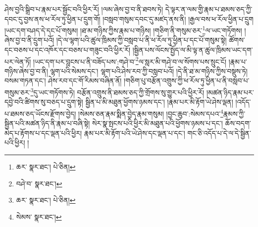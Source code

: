 ཤེས་བྱའི་སྒྲིབ་པ་རྣམ་པར་སྦྱོང་བའི་ཕྱིར་རོ། །ལམ་ཞེས་བྱ་བ་ནི་ཐབས་ཏེ། དེ་ལྟར་ན་ལམ་གྱི་རྣམ་པ་ཐམས་ཅད་ཀྱི་དབང་དུ་བྱས་ནས་ཕ་རོལ་ཏུ་ཕྱིན་པ་དྲུག་གོ། །བསླབ་གསུམ་དབང་དུ་མཛད་ནས་ནི། །རྒྱལ་བས་ཕ་རོལ་ཕྱིན་པ་དྲུག །ཡང་དག་བཤད་དེ་དང་པོ་གསུམ། །ཐ་མ་གཉིས་ཀྱིས་རྣམ་པ་གཉིས། །གཅིག་ནི་གསུམ་ཅར་\footnote{ཆར་  སྣར་ཐང་།  པེ་ཅིན། }ལ་ཡང་གཏོགས། །ཞེས་བྱ་བ་ནི་དྲུག་པའོ། །དེ་ལ་ལྷག་པའི་ཚུལ་ཁྲིམས་ཀྱི་བསླབ་པ་ནི་ཕ་རོལ་ཏུ་ཕྱིན་པ་དང་པོ་གསུམ་སྟེ། ཚོགས་དང་བཅས་པ་དང་འཁོར་དང་བཅས་པ་གཟུང་བའི་ཕྱིར་རོ། །སྦྱིན་པས་ལོངས་སྤྱོད་ལ་མི་ལྟ་ན་ཚུལ་ཁྲིམས་ཡང་དག་པར་ལེན་ཏོ། །ཡང་དག་པར་བླངས་པ་ནི་བཟོད་པས་:གཤེ་བ་\footnote{བཤེ་བ་  སྣར་ཐང་། }ལ་སླར་མི་གཤེ་བ་ལ་སོགས་པས་སྲུང་ངོ། །རྣམ་པ་གཉིས་ཞེས་བྱ་བ་ནི། ལྷག་པའི་སེམས་དང་། ལྷག་པའི་ཤེས་རབ་ཀྱི་བསླབ་པའོ། །དེ་ནི་ཐ་མ་གཉིས་ཀྱིས་བསྡུས་ཏེ། བསམ་གཏན་དང་། ཤེས་རབ་དང་གོ་རིམས་བཞིན་ནོ། །གཅིག་པུ་བརྩོན་འགྲུས་ཀྱི་ཕ་རོལ་ཏུ་ཕྱིན་པ་ནི་བསླབ་པ་གསུམ་ཅར་\footnote{ཆར་  སྣར་ཐང་།  པེ་ཅིན། }དུ་ཡང་གཏོགས་ཏེ། བརྩོན་འགྲུས་ནི་ཐམས་ཅད་ཀྱི་གྲོགས་སུ་གྱུར་པའི་ཕྱིར་རོ། །མཚན་ཉིད་རྣམ་པར་དབྱེ་བའི་ཚིགས་སུ་བཅད་པ་དྲུག་སྟེ། སྦྱིན་པ་མི་མཐུན་ཕྱོགས་ཉམས་དང་། །རྣམ་པར་མི་རྟོག་ཡེ་ཤེས་ལྡན། །འདོད་པ་ཐམས་ཅད་ཡོངས་རྫོགས་བྱེད། །སེམས་ཅན་རྣམ་སྨིན་བྱེད་རྣམ་གསུམ། །བྱང་ཆུབ་:སེམས་དཔའ་\footnote{སེམས་  སྣར་ཐང་། }རྣམས་ཀྱི་སྦྱིན་པའི་མཚན་ཉིད་ནི་རྣམ་པ་བཞི་སྟེ། སེར་སྣ་སྤངས་པའི་ཕྱིར་མི་མཐུན་པའི་ཕྱོགས་ཉམས་པ་དང་། ཆོས་བདག་མེད་པ་རྟོགས་པ་དང་ལྡན་པའི་ཕྱིར། རྣམ་པར་མི་རྟོག་པའི་ཡེ་ཤེས་དང་ལྡན་པ་དང་། གང་ཅི་འདོད་པ་དེ་ལ་དེ་སྦྱིན་པའི་ཕྱིར། །

